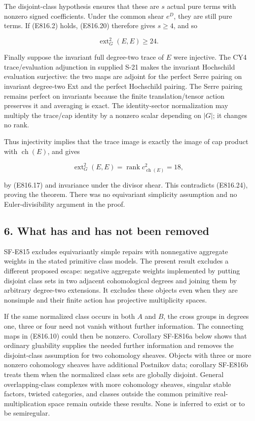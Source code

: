 The disjoint-class hypothesis ensures that these are \(s\) actual pure
terms with nonzero signed coefficients. Under the common shear \(e^D\),
they are still pure terms. If (E816.2) holds, (E816.20) therefore gives
\(s\ge4\), and so

\[
 \operatorname{ext}^2_G(E,E)\ge24.
 \tag{E816.24}
\]

Finally suppose the invariant full degree-two trace of \(E\) were
injective. The CY4 trace/evaluation adjunction in supplied S-21 makes
the invariant Hochschild evaluation surjective: the two maps are adjoint
for the perfect Serre pairing on invariant degree-two Ext and the
perfect Hochschild pairing. The Serre pairing remains perfect on
invariants because the finite translation/tensor action preserves it and
averaging is exact. The identity-sector normalization may multiply the
trace/cap identity by a nonzero scalar depending on \(|G|\); it changes
no rank.

Thus injectivity implies that the trace image is exactly the image of
cap product with \(\operatorname{ch}(E)\), and gives

\[
 \operatorname{ext}^2_G(E,E)
    =\operatorname{rank}c^2_{\operatorname{ch}(E)}=18,
 \tag{E816.25}
\]

by (E816.17) and invariance under the divisor shear. This contradicts
(E816.24), proving the theorem. There was no equivariant simplicity
assumption and no Euler-divisibility argument in the proof.

\subsection{6. What has and has not been
removed}\label{SF-E816-what-has-and-has-not-been-removed}

SF-E815 excludes equivariantly simple repairs with nonnegative aggregate
weights in the stated primitive class models. The present result
excludes a different proposed escape: negative aggregate weights
implemented by putting disjoint class sets in two adjacent cohomological
degrees and joining them by arbitrary degree-two extensions. It excludes
these objects even when they are nonsimple and their finite action has
projective multiplicity spaces.

If the same normalized class occurs in both \(A\) and \(B\), the cross
groups in degrees one, three or four need not vanish without further
information. The connecting maps in (E816.10) could then be nonzero.
Corollary SF-E816a below shows that ordinary gluability supplies the
needed further information and removes the disjoint-class assumption for
two cohomology sheaves. Objects with three or more nonzero cohomology
sheaves have additional Postnikov data; corollary SF-E816b treats them
when the normalized class sets are globally disjoint. General
overlapping-class complexes with more cohomology sheaves, singular
stable factors, twisted categories, and classes outside the common
primitive real-multiplication space remain outside these results. None
is inferred to exist or to be semiregular.

